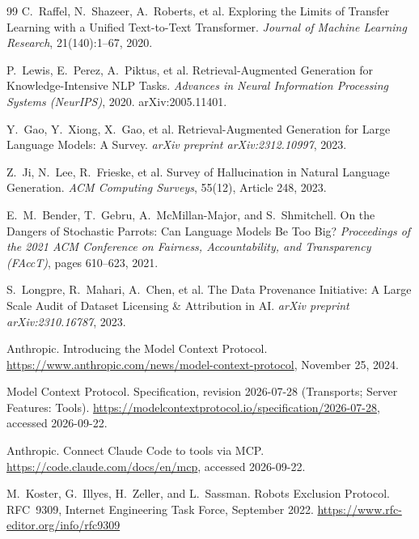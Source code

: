 \documentclass[11pt]{article}
\begin{document}
\begin{thebibliography}{99}
C.~Raffel, N.~Shazeer, A.~Roberts, et al.
\newblock Exploring the Limits of Transfer Learning with a Unified Text-to-Text Transformer.
\newblock \emph{Journal of Machine Learning Research}, 21(140):1--67, 2020.

P.~Lewis, E.~Perez, A.~Piktus, et al.
\newblock Retrieval-Augmented Generation for Knowledge-Intensive NLP Tasks.
\newblock \emph{Advances in Neural Information Processing Systems (NeurIPS)}, 2020.
\newblock arXiv:2005.11401.

Y.~Gao, Y.~Xiong, X.~Gao, et al.
\newblock Retrieval-Augmented Generation for Large Language Models: A Survey.
\newblock \emph{arXiv preprint arXiv:2312.10997}, 2023.

Z.~Ji, N.~Lee, R.~Frieske, et al.
\newblock Survey of Hallucination in Natural Language Generation.
\newblock \emph{ACM Computing Surveys}, 55(12), Article 248, 2023.

E.~M.~Bender, T.~Gebru, A.~McMillan-Major, and S.~Shmitchell.
\newblock On the Dangers of Stochastic Parrots: Can Language Models Be Too Big?
\newblock \emph{Proceedings of the 2021 ACM Conference on Fairness, Accountability, and Transparency (FAccT)}, pages 610--623, 2021.

S.~Longpre, R.~Mahari, A.~Chen, et al.
\newblock The Data Provenance Initiative: A Large Scale Audit of Dataset Licensing \& Attribution in AI.
\newblock \emph{arXiv preprint arXiv:2310.16787}, 2023.

Anthropic.
\newblock Introducing the Model Context Protocol.
\newblock \url{https://www.anthropic.com/news/model-context-protocol}, November 25, 2024.

Model Context Protocol.
\newblock Specification, revision 2026-07-28 (Transports; Server Features: Tools).
\newblock \url{https://modelcontextprotocol.io/specification/2026-07-28}, accessed 2026-09-22.

Anthropic.
\newblock Connect Claude Code to tools via MCP.
\newblock \url{https://code.claude.com/docs/en/mcp}, accessed 2026-09-22.

M.~Koster, G.~Illyes, H.~Zeller, and L.~Sassman.
\newblock Robots Exclusion Protocol.
\newblock RFC~9309, Internet Engineering Task Force, September 2022.
\newblock \url{https://www.rfc-editor.org/info/rfc9309}


\end{thebibliography}
\end{document}
